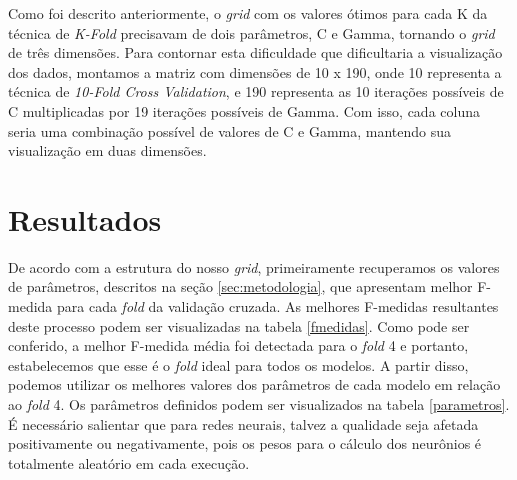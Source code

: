 \documentclass[10pt, conference, compsocconf]{IEEEtran}
\begin{document}
Como foi descrito anteriormente, o \textit{grid} com os valores ótimos para cada K da
técnica de \textit{K-Fold} precisavam de dois parâmetros, C e Gamma, tornando o \textit{grid} de
três dimensões. Para contornar esta dificuldade que dificultaria a visualização 
dos dados, montamos a matriz com dimensões de 10 x 190, onde 10 representa a 
técnica de \textit{10-Fold Cross Validation}, e 190 representa as 10 iterações possíveis 
de C multiplicadas por 19 iterações possíveis de Gamma. Com isso, cada coluna 
seria uma combinação possível de valores de C e Gamma, mantendo sua visualização em duas dimensões.



\section{Resultados}\label{sec:resultados}
De acordo com a estrutura do nosso \textit{grid}, primeiramente recuperamos os valores 
de parâmetros, descritos na seção \ref{sec:metodologia}, que apresentam melhor 
F-medida para cada \textit{fold} da validação cruzada. As melhores F-medidas resultantes 
deste processo podem ser visualizadas na tabela \ref{fmedidas}. Como pode 
ser conferido, a melhor F-medida média foi detectada para o \textit{fold} 4 e 
portanto, estabelecemos que esse é o \textit{fold} ideal para todos os modelos. A partir 
disso, podemos utilizar os melhores valores dos parâmetros de cada modelo em 
relação ao \textit{fold} 4. Os parâmetros definidos podem ser visualizados na tabela
\ref{parametros}. É necessário salientar que para redes neurais, talvez a 
qualidade seja afetada positivamente ou negativamente, pois os pesos para o 
cálculo dos neurônios é totalmente aleatório em cada execução.
\end{document}
